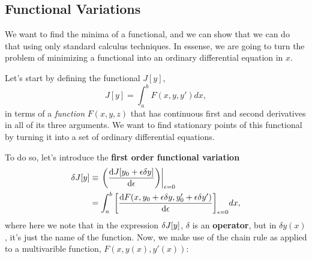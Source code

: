 \subsection{Functional Variations}
We want to find the minima of a functional, and we can show that we can do that using only standard calculus techniques. In essense, we are going to turn the problem of minimizing a functional into an ordinary differential equation in $x$.

Let's start by defining the functional $J[y]$,
\begin{equation}
  \label{eq:generic_functional}
  J[y] = \int_a^b F(x, y, y') dx,
\end{equation}
in terms of a \emph{function} $F(x, y, z)$ that has continuous first and second derivatives in all of its three arguments. We want to find stationary points  of this functional by turning it into a set of ordinary differential equations.

To do so, let's introduce the \textbf{first order functional variation}
\begin{equation}
  \label{eq:first_order_functional_variation}
  \begin{split}
    \var{J[y]} & \equiv \eval{\qty(\dv{J[y_0+\epsilon \delta y]}{\epsilon})}_{\epsilon=0}\\
    & = \int_a^b \qty[\dv{F(x, y_0 + \epsilon \delta y, y_0' + \epsilon \delta y')}{\epsilon}]_{\epsilon = 0} dx,    
  \end{split}
\end{equation}
where here we note that in the expression $\var{J[y]}$, $\delta$ is an \textbf{operator}, but in $\delta y(x)$, it's just the name of the function. Now, we make use of the chain rule as applied to a multivarible function, $F(x, y(x), y'(x))$:

